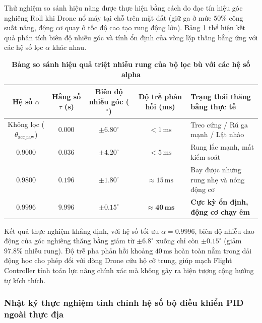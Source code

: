 Thử nghiệm so sánh hiệu năng được thực hiện bằng cách đo đạc tín hiệu góc nghiêng Roll khi Drone nổ máy tại chỗ trên mặt đất (giữ ga ở mức $50\%$ công suất nâng, động cơ quay ở tốc độ cao tạo rung động lớn). Bảng \ref{tab:filter_coefficients_comparison} thể hiện kết quả phân tích biên độ nhiễu góc và tính ổn định của vòng lặp thăng bằng ứng với các hệ số lọc $\alpha$ khác nhau.

\begin{table}[H]
\centering
\caption[Bảng so sánh hiệu quả triệt nhiễu rung của bộ lọc bù với các hệ số alpha]{\bfseries\fontsize{12pt}{0pt}\selectfont Bảng so sánh hiệu quả triệt nhiễu rung của bộ lọc bù với các hệ số alpha}
\label{tab:filter_coefficients_comparison}
\fontsize{10pt}{12pt}\selectfont
\begin{tabularx}{\textwidth}{|c|c|c|c|X|}
\hline
\textbf{Hệ số $\alpha$} & \textbf{Hằng số $\tau$ (s)} & \textbf{Biên độ nhiễu góc ($^\circ$)} & \textbf{Độ trễ phản hồi (ms)} & \textbf{Trạng thái thăng bằng thực tế} \\ \hline
Không lọc ($\theta_{\text{acc\_raw}}$) & $0.000$ & $\pm 6.80^\circ$ & $< 1\,\text{ms}$ & Treo cứng / Rú ga mạnh / Lật nhào \\ \hline
$0.9000$ & $0.036$ & $\pm 4.20^\circ$ & $< 5\,\text{ms}$ & Rung lắc mạnh, mất kiểm soát \\ \hline
$0.9800$ & $0.196$ & $\pm 1.80^\circ$ & $\approx 15\,\text{ms}$ & Bay được nhưng rung nhẹ và nóng động cơ \\ \hline
$\mathbf{0.9996}$ & $\mathbf{9.996}$ & $\mathbf{\pm 0.15^\circ}$ & $\mathbf{\approx 40\,\text{ms}}$ & \textbf{Cực kỳ ổn định, động cơ chạy êm} \\ \hline
\end{tabularx}
\end{table}

Kết quả thực nghiệm khẳng định, với hệ số tối ưu $\alpha = 0.9996$, biên độ nhiễu dao động của góc nghiêng thăng bằng giảm từ $\pm 6.8^\circ$ xuống chỉ còn $\pm 0.15^\circ$ (giảm $97.8\%$ nhiễu rung). Độ trễ pha phản hồi khoảng $40\,\text{ms}$ hoàn toàn nằm trong dải động học cho phép đối với dòng Drone cứu hộ cỡ trung, giúp mạch Flight Controller tính toán lực nâng chính xác mà không gây ra hiện tượng cộng hưởng tự kích thích.

\subsubsection{Nhật ký thực nghiệm tinh chỉnh hệ số bộ điều khiển PID ngoài thực địa}

